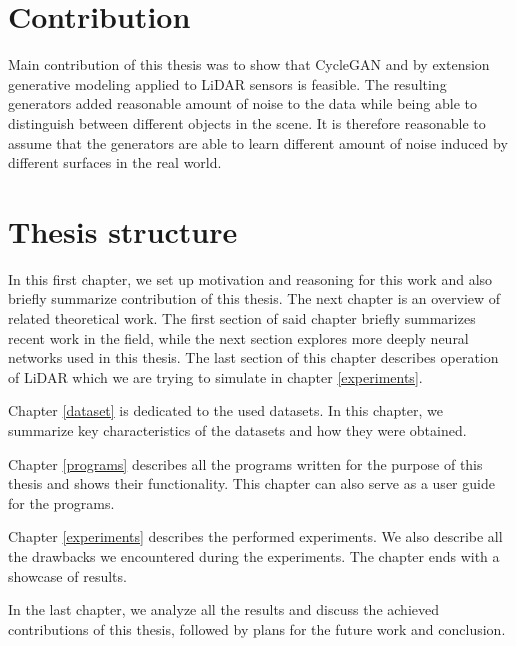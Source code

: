 \section{Contribution}
Main contribution of this thesis was to show that CycleGAN and by extension generative modeling applied to LiDAR sensors is feasible. The resulting generators added reasonable amount of noise to the data while being able to distinguish between different objects in the scene. It is therefore reasonable to assume that the generators are able to learn different amount of noise induced by different surfaces in the real world.

\section{Thesis structure}
In this first chapter, we set up motivation and reasoning for this work and also briefly summarize contribution of this thesis. The next chapter is an overview of related theoretical work. The first section of said chapter briefly summarizes recent work in the field, while the next section explores more deeply neural networks used in this thesis. The last section of this chapter describes operation of LiDAR which we are trying to simulate in chapter \ref{experiments}.

Chapter \ref{dataset} is dedicated to the used datasets. In this chapter, we summarize key characteristics of the datasets and how they were obtained.

Chapter \ref{programs} describes all the programs written for the purpose of this thesis and shows their functionality. This chapter can also serve as a user guide for the programs.

Chapter \ref{experiments} describes the performed experiments. We also describe all the drawbacks we encountered during the experiments. The chapter ends with a showcase of results.

In the last chapter, we analyze all the results and discuss the achieved contributions of this thesis, followed by plans for the future work and conclusion.
